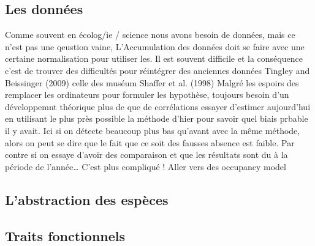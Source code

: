 \subsection{Les données}\label{les-donnuxe9es}

Comme souvent en écolog/ie / science nous avons besoin de données, mais
ce n'est pas une qeustion vaine, L'Accumulation des données doit se
faire avec une certaine normalisation pour utiliser les. Il est souvent
difficile et la conséquence c'est de trouver des difficultés pour
réintégrer des anciennes données Tingley and Beissinger (2009) celle des
muséum Shaffer et al. (1998) Malgré les espoirs des remplacer les
ordinateurs pour formuler les hypothèse, toujours besoin d'un
développemnt théorique plus de que de corrélations essayer d'estimer
aujourd'hui en utilisant le plus près possible la méthode d'hier pour
savoir quel biais prbable il y avait. Ici si on détecte beaucoup plus
bas qu'avant avec la même méthode, alors on peut se dire que le fait que
ce soit des fausses absence est faible. Par contre si on essaye d'avoir
des comparaison et que les résultats sont du à la période de
l'année\ldots{} C'est plus compliqué ! Aller vers des occupancy model

\subsection{L'abstraction des
espèces}\label{labstraction-des-espuxe8ces}

\subsection*{Traits fonctionnels}\label{traits-fonctionnels}

